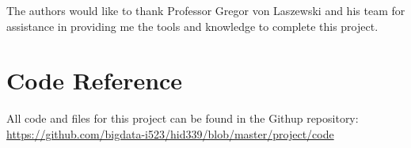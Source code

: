\begin{acks}
The authors would like to thank Professor Gregor von Laszewski and his
team for assistance in providing me the tools and  knowledge to
complete this project. 
\end{acks}


 


\newpage
\appendix
\section{Code Reference}
All code and files for this project can be found in the Githup repository:
\url{https://github.com/bigdata-i523/hid339/blob/master/project/code}


